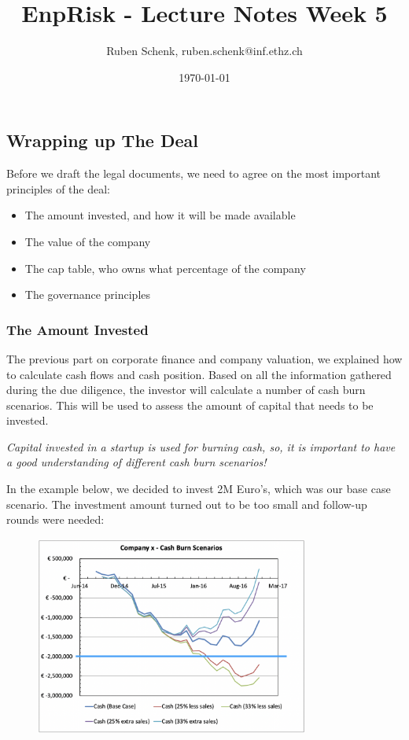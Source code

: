 \documentclass[a4paper]{extarticle}
\title{EnpRisk - Lecture Notes Week 5}
\author{Ruben Schenk, ruben.schenk@inf.ethz.ch}
\date{\today}
\begin{document}
\maketitle
\newpage

\subsection{Wrapping up The Deal}

Before we draft the legal documents, we need to agree on the most important principles of the deal:

\begin{itemize}
    \item The amount invested, and how it will be made available
    \item The value of the company
    \item The cap table, who owns what percentage of the company
    \item The governance principles
\end{itemize}

\subsubsection{The Amount Invested}

The previous part on corporate finance and company valuation, we explained how to calculate cash flows and cash position. Based on all the information gathered during the due diligence, the investor will calculate a number of cash burn scenarios. This will be used to assess the amount of capital that needs to be invested.

\textit{Capital invested in a startup is used for burning cash, so, it is important to have a good understanding of different cash burn scenarios!}

In the example below, we decided to invest 2M Euro's, which was our base case scenario. The investment amount turned out to be too small and follow-up rounds were needed:

\begin{figure}[H]
    \includegraphics[width=9cm]{../images/EnpRisk_Fig5-1}
    \centering
\end{figure}
\end{document}
